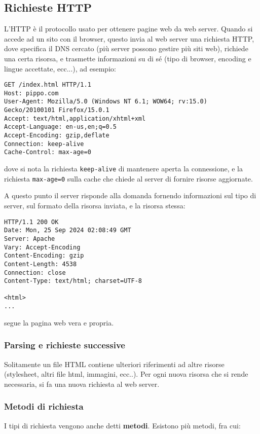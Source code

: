 \documentclass[a4paper,11pt]{article}
\begin{document}
\subsection{Richieste HTTP}
L'HTTP è il protocollo usato per ottenere pagine web da web server.
Quando si accede ad un sito con il browser, questo invia al web server una richiesta HTTP, dove specifica il DNS cercato (più server possono gestire più siti web), richiede una certa risorsa, e trasmette informazioni su di sé (tipo di browser, encoding e lingue accettate, ecc...), ad esempio:

\begin{lstlisting}[style=shellstyle]
GET /index.html HTTP/1.1
Host: pippo.com
User-Agent: Mozilla/5.0 (Windows NT 6.1; WOW64; rv:15.0) Gecko/20100101 Firefox/15.0.1
Accept: text/html,application/xhtml+xml
Accept-Language: en-us,en;q=0.5
Accept-Encoding: gzip,deflate
Connection: keep-alive
Cache-Control: max-age=0
\end{lstlisting}

dove si nota la richiesta \texttt{keep-alive} di mantenere aperta la connessione, e la richiesta \texttt{max-age=0} sulla cache che chiede al server di fornire risorse aggiornate. 

A questo punto il server risponde alla domanda fornendo informazioni sul tipo di server, sul formato della risorsa inviata, e la risorsa stessa:

\begin{lstlisting}[style=shellstyle]
HTTP/1.1 200 OK
Date: Mon, 25 Sep 2024 02:08:49 GMT
Server: Apache
Vary: Accept-Encoding
Content-Encoding: gzip
Content-Length: 4538
Connection: close
Content-Type: text/html; charset=UTF-8

<html>
...
\end{lstlisting}

segue la pagina web vera e propria.

\subsubsection{Parsing e richieste successive}
Solitamente un file HTML contiene ulteriori riferimenti ad altre risorse (stylesheet, altri file html, immagini, ecc..).
Per ogni nuova risorsa che si rende necessaria, si fa una nuova richiesta al web server.

\subsubsection{Metodi di richiesta}
I tipi di richiesta vengono anche detti \textbf{metodi}.
Esistono più metodi, fra cui:
\end{document}
